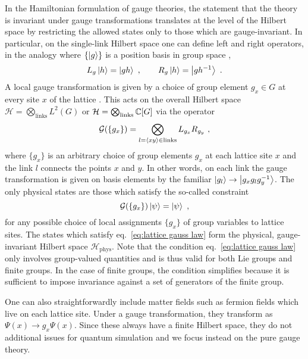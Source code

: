In the Hamiltonian formulation of gauge theories, the statement that the theory is invariant under gauge transformations translates at the level of the Hilbert space by restricting the allowed states only to those which are gauge-invariant.
In particular, on the single-link Hilbert space one can define left and right  operators, in the analogy where $\{\ket{g}\}$ is a position basis in group space \cite{ZoharBurrello},
\begin{equation}
    \label{eq:regular representations}
    L_g \ket{h} = \ket{gh} \ , \quad \quad R_g \ket{h} = \ket{gh^{-1}} \ .
\end{equation}
A local gauge transformation is given by a choice of group element $g_x \in G$ at every site $x$ of the lattice \cite{Osborne}.
This acts on the overall Hilbert space $\mathcal{H} = \bigotimes_{\mathrm{links}} L^2(G)$ or $\mathcal{H} = \bigotimes_{\mathrm{links}} \mathbb{C}[G]$ via the operator
\begin{equation}
    \label{eq:gauss law operator}
    \mathcal{G}(\{g_x\}) = \bigotimes_{l=\expval{xy} \in \mathrm{links}} L_{g_{x}} R_{g_y} \ ,
\end{equation}
where $\{g_x\}$ is an arbitrary choice of group elements $g_x$ at each lattice site $x$ and the link $l$ connects the points $x$ and $y$.
In other words, on each link the gauge transformation is given on basis elements by the familiar $\ket{g_l} \to \ket{g_x g_l g_y^{-1}}$.
The only physical states are those which satisfy the so-called  constraint \cite{KogSuss, Osborne, Tong}
\begin{equation}
    \label{eq:lattice gauss law}
    \mathcal{G}(\{g_x\}) \ket{\psi}=\ket{\psi} \ ,
\end{equation}
for any possible choice of local assignments $\{g_x\}$ of group variables to lattice sites.
The states which satisfy eq.~\eqref{eq:lattice gauss law} form the physical, gauge-invariant Hilbert space $\mathcal{H}_\mathrm{phys}$.
Note that the condition eq.~\eqref{eq:lattice gauss law} only involves group-valued quantities and is thus valid for both Lie groups and finite groups.
In the case of finite groups, the condition simplifies because it is sufficient to impose invariance against a set of generators of the finite group.

One can also straightforwardly include matter fields such as fermion fields which live on each lattice site.
Under a gauge transformation, they transform as $\Psi(x) \to g_x \Psi(x)$.
Since these always have a finite Hilbert space, they do not additional issues for quantum simulation and we focus instead on the pure gauge theory.

